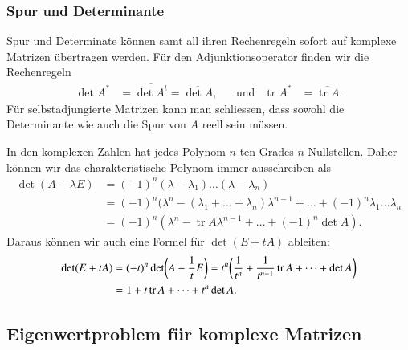 \subsubsection{Spur und Determinante}
%
%
Spur und Determinate können samt all ihren Rechenregeln sofort auf
komplexe Matrizen übertragen werden.
Für den Adjunktionsoperator finden wir die Rechenregeln
\[
\begin{aligned}
\det A^*&= \overline{\det A^t}=\overline{\det A},
&&\text{und}&
\operatorname{tr} A^*&=\overline{\operatorname{tr}A}.
\end{aligned}
\]
Für selbstadjungierte Matrizen kann man schliessen, dass sowohl
die Determinante wie auch die Spur von $A$ reell sein müssen.

In den komplexen Zahlen hat jedes Polynom $n$-ten Grades $n$ Nullstellen.
Daher können wir das charakteristische Polynom immer ausschreiben als
\begin{align*}
\det(A-\lambda E)
&=
(-1)^n (\lambda-\lambda_1)\dots(\lambda-\lambda_n)
\\
&=
(-1)^n(\lambda^n -(\lambda_1+\dots+\lambda_n)\lambda^{n-1}+\dots
+(-1)^n\lambda_1\dots\lambda_n
\\
&=
(-1)^n(\lambda^n - \operatorname{tr}A\lambda^{n-1}+\dots + (-1)^n\det A).
\end{align*}
Daraus können wir auch eine Formel für $\det(E+tA)$ ableiten:
\begin{align}
\det(E+tA)
&=
(-t)^n\det\biggl(A-\frac1tE\biggr)
=
t^n\biggl(
\frac1{t^n}+\frac1{t^{n-1}}\operatorname{tr}A+\dots+\det A
\biggr)
\notag
\\
&=
1+t\operatorname{tr}A+\dots+t^n\operatorname{det}A.
\label{skript:detandtrace}
\end{align}

%
%
\subsection{Eigenwertproblem für komplexe Matrizen}
